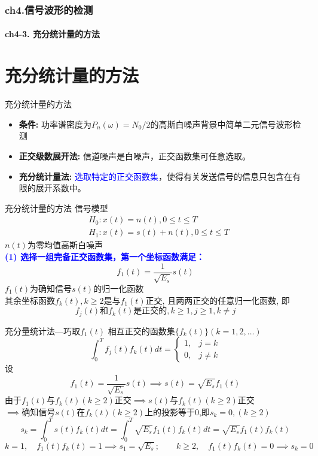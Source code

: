 \begin{frame}[shrink]
  \frametitle{ch4.信号波形的检测}
  \framesubtitle{ch4-3. 充分统计量的方法}
  \tableofcontents[hideallsubsections]
\end{frame}

\section{充分统计量的方法}

\begin{frame}{充分统计量的方法}
\begin{itemize}
	\setlength{\itemsep}{.5cm}
	\item \textbf{条件: }功率谱密度为$P_n(\omega)=N_0/2$的高斯白噪声背景中简单二元信号波形检测
	\item \textbf{正交级数展开法: }信道噪声是白噪声，正交函数集可任意选取。
	\item \textbf{充分统计量法: }\textcolor{blue}{选取特定的正交函数集}，使得有关发送信号的信息只包含在有限的展开系数中。	
\end{itemize}
\end{frame}

\begin{frame}{充分统计量的方法}
信号模型
\begin{align*}
&H_0: x(t)=n(t), 0\le t\le T\\
&H_1: x(t)=s(t)+n(t), 0\le t\le T
\end{align*}
$n(t)$为零均值高斯白噪声\\
\textbf{\textcolor{blue}{(1) 选择一组完备正交函数集，第一个坐标函数满足：}}
\[f_1(t)=\frac{1}{\sqrt{E_s}}s(t)\]
$f_1(t)$为确知信号$s(t)$的归一化函数\\
其余坐标函数$f_k(t), k\ge 2$是与$f_1(t)$正交, 且两两正交的任意归一化函数, 即
\[f_j(t)\text{和}f_k(t)\text{是正交的}, k\ge 1, j\ge 1, k\ne j \]
\end{frame}

\begin{frame}[shrink]{充分量统计法---巧取$f_1(t)$}
相互正交的函数集$\{f_k(t)\}(k=1,2,\dots)$
\[
\int_{0}^{T}f_j(t)f_k(t)dt=
\begin{cases}
1,&j=k\\
0,&j\ne k
\end{cases}
\]
设
\[ f_1(t)=\frac{1}{\sqrt{E_s}}s(t)\implies s(t)=\sqrt{E_s}f_1(t) \]
由于$f_1(t)$与$f_k(t)(k\ge 2)$正交$\implies s(t)$与$f_k(t)(k\ge 2)$正交\\
$\implies$确知信号$s(t)$在$f_k(t)(k\ge 2)$上的投影等于0,即$s_k=0,(k\ge 2)$\\
\[s_k=\int_{0}^{T}s(t)f_k(t)dt=\int_{0}^{T}\sqrt{E_s}f_1(t)f_k(t)dt=\sqrt{E_s}f_1(t)f_k(t) \]
$k=1,\quad f_1(t)f_k(t)=1\implies s_1=\sqrt{E_s};\qquad k\ge 2,\quad f_1(t)f_k(t)=0\implies s_k=0$\\
\end{frame}

